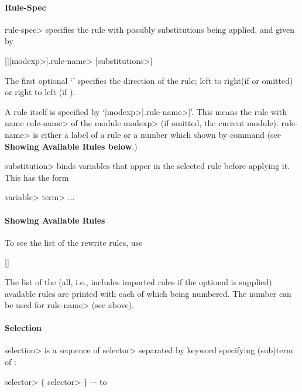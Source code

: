 \paragraph{Rule-Spec}
\<rule-spec> specifies the rule with possibly substitutions being
applied, and given by 

[\kbd{+ | -}][\<modexp>].\<rule-name> [\<substitutions>]

The first optional `\kbd{+ | -}' specifies the direction of the rule; 
left to right(if \kbd{+} or omitted) or right to left (if \kbd{-}).

A rule itself is specified by `[\<modexp>].\<rule-name>]'. This means
the rule with name \<rule-name> of the module \<modexp> (if omitted, the
current module). \<rule-name> is either a label of a rule or a number 
which shown by  command (see {\bf Showing Available
  Rules below}.) 

\<substitution> binds variables that apper in the selected rule before 
applying it. This has the form

 \<variable> \kbd{=} \<term> \kbd{,} ...

\paragraph{Showing Available Rules}
To see the list of the rewrite rules, use

 [] 

The list of the (all, i.e., includes imported rules if the optional
 is supplied) available rules are printed with each of which
being numbered.  The number can be used for \<rule-name> (see above).

\paragraph{Selection}
\<selection> is a sequence of \<selector> separated by keyword
 specifying (sub)term of :

\<selector> $\{$  \<selector> $\}$ $\cdots$ 
\paralign to 

